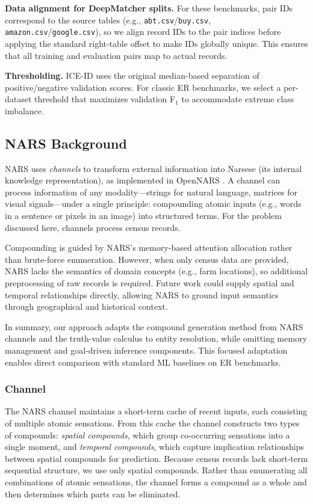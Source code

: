 \documentclass{article}
\begin{document}
\textbf{Data alignment for DeepMatcher splits.} For these benchmarks, pair IDs correspond to the source tables (e.g., \texttt{abt.csv}/\texttt{buy.csv}, \texttt{amazon.csv}/\texttt{google.csv}), so we align record IDs to the pair indices before applying the standard right-table offset to make IDs globally unique. This ensures that all training and evaluation pairs map to actual records.

\textbf{Thresholding.} ICE-ID uses the original median-based separation of positive/negative validation scores. For classic ER benchmarks, we select a per-dataset threshold that maximizes validation F$_1$ to accommodate extreme class imbalance.

\subsection{NARS Background}
\label{subsec:nars_background}
NARS \cite{wang} uses \emph{channels} to transform external information into Narsese (its internal knowledge representation), as implemented in OpenNARS \cite{hammer}. A channel can process information of any modality---strings for natural language, matrices for visual signals---under a single principle: compounding atomic inputs (e.g., words in a sentence or pixels in an image) into structured terms. For the problem discussed here, channels process census records.

Compounding is guided by NARS's memory-based attention allocation rather than brute-force enumeration. However, when only census data are provided, NARS lacks the semantics of domain concepts (e.g., farm locations), so additional preprocessing of raw records is required. Future work could supply spatial and temporal relationships directly, allowing NARS to ground input semantics through geographical and historical context.

In summary, our approach adapts the compound generation method from NARS channels and the truth-value calculus to entity resolution, while omitting memory management and goal-driven inference components. This focused adaptation enables direct comparison with standard ML baselines on ER benchmarks.

\subsubsection{Channel}

The NARS channel maintains a short-term cache of recent inputs, each consisting of multiple atomic sensations. From this cache the channel constructs two types of compounds: \emph{spatial compounds}, which group co-occurring sensations into a single moment, and \emph{temporal compounds}, which capture implication relationships between spatial compounds for prediction. Because census records lack short-term sequential structure, we use only spatial compounds.
Rather than enumerating all combinations of atomic sensations, the channel forms a compound as a whole and then determines which parts can be eliminated.
\end{document}
